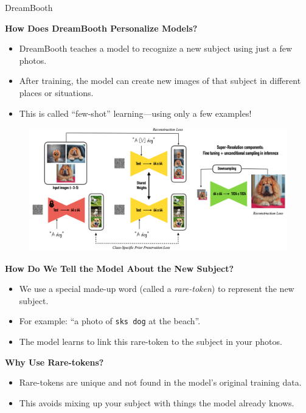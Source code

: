 \begin{frame}[allowframebreaks]{DreamBooth}
\framebreak

\textbf{How Does DreamBooth Personalize Models?}
\begin{itemize}
    \item DreamBooth teaches a model to recognize a new subject using just a few photos.
    \item After training, the model can create new images of that subject in different places or situations.
    \item This is called ``few-shot'' learning—using only a few examples!
\end{itemize}

\framebreak
\begin{figure}
    \centering
    \includegraphics[width=\linewidth,height=\textheight,keepaspectratio]{images/adv-img-gen/dreambooth-3.png}
\end{figure}

\framebreak

\textbf{How Do We Tell the Model About the New Subject?}
\begin{itemize}
    \item We use a special made-up word (called a \textit{rare-token}) to represent the new subject.
    \item For example: ``a photo of \texttt{sks dog} at the beach''.
    \item The model learns to link this rare-token to the subject in your photos.
\end{itemize}

\framebreak

\textbf{Why Use Rare-tokens?}
\begin{itemize}
    \item Rare-tokens are unique and not found in the model's original training data.
    \item This avoids mixing up your subject with things the model already knows.
\end{itemize}


\end{frame}
